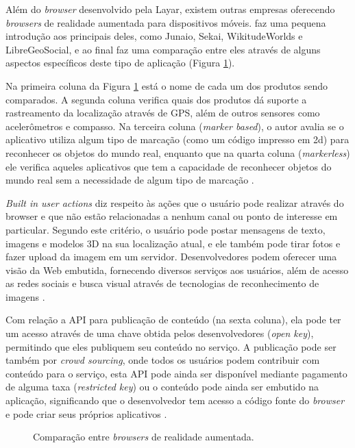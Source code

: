 \documentclass[diss]{template/setrem}
\begin{document}
Além do \emph{browser} desenvolvido pela Layar, existem outras empresas oferecendo \emph{browsers} de realidade aumentada para dispositivos móveis. \citet{Butchart2012} faz uma pequena introdução aos principais deles, como Junaio, Sekai, WikitudeWorlds e LibreGeoSocial, e ao final faz uma comparação entre eles através de alguns aspectos específicos deste tipo de aplicação (Figura \ref{fig:ar-comparison}).

Na primeira coluna da Figura \ref{fig:ar-comparison} está o nome de cada um dos produtos sendo comparados. A segunda coluna verifica quais dos produtos dá suporte a rastreamento da localização através de GPS, além de outros sensores como acelerômetros e compasso. Na terceira coluna (\emph{marker based}), o autor avalia se o aplicativo utiliza algum tipo de marcação (como um código impresso em 2d) para reconhecer os objetos do mundo real, enquanto que na quarta coluna (\emph{markerless}) ele verifica aqueles aplicativos que tem a capacidade de reconhecer objetos do mundo real sem a necessidade de algum tipo de marcação \citep{Butchart2012}.

\emph{Built in user actions} diz respeito às ações que o usuário pode realizar através do browser e que não estão relacionadas a nenhum canal ou ponto de interesse em particular. Segundo este critério, o usuário pode postar mensagens de texto, imagens e modelos 3D na sua localização atual, e ele também pode tirar fotos e fazer upload da imagem em um servidor. Desenvolvedores podem oferecer uma visão da Web embutida, fornecendo diversos serviços aos usuários, além de acesso as redes sociais e busca visual através de tecnologias de reconhecimento de imagens \citep{Butchart2012}.

Com relação a API para publicação de conteúdo (na sexta coluna), ela pode ter um acesso através de uma chave obtida pelos desenvolvedores (\emph{open key}), permitindo que eles publiquem seu conteúdo no serviço. A publicação pode ser também por \emph{crowd sourcing}, onde todos os usuários podem contribuir com conteúdo para o serviço, esta API pode ainda ser disponível mediante pagamento de alguma taxa (\emph{restricted key}) ou o conteúdo pode ainda ser embutido na aplicação, significando que o desenvolvedor tem acesso a código fonte do \emph{browser} e pode criar seus próprios aplicativos \citep{Butchart2012}.

\begin{figure}[!h]
    \caption{Comparação entre \emph{browsers} de realidade aumentada.}
    \label{fig:ar-comparison}
\end{figure}
\end{document}
